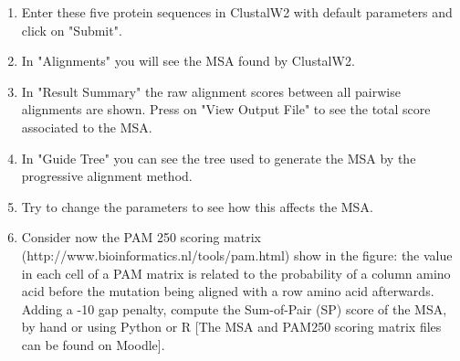 \documentclass[a4paper,11pt]{article}
\begin{document}
\begin{enumerate}
\item Enter these five protein sequences in ClustalW2 with default parameters and click on "Submit".
\item In "Alignments" you will see the MSA found by ClustalW2. 
\item In "Result Summary" the raw alignment scores between all pairwise alignments are shown. Press on "View Output File" to see the total score associated to the MSA. 
\item In "Guide Tree" you can see the tree used to generate the MSA by the progressive alignment method. 
\item Try to change the parameters to see how this affects the MSA.
\item Consider now the PAM 250 scoring matrix (http://www.bioinformatics.nl/tools/pam.html) show in the figure: the value in each cell of a PAM matrix is related to the probability of a column amino acid before the mutation being aligned with a row amino acid afterwards.
Adding a -10 gap penalty, compute the Sum-of-Pair (SP) score of the MSA, by hand or using Python or R [The MSA and PAM250 scoring matrix files can be found on Moodle].
\end{enumerate}
\end{document}
